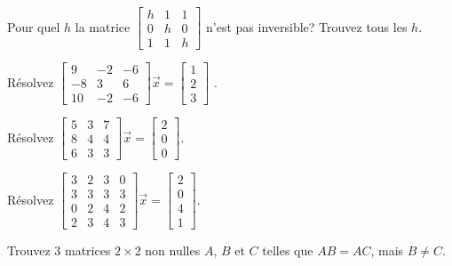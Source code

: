 \begin{exercise}
Pour quel $h$ la matrice
$\left[ \begin{smallmatrix}
h & 1 & 1 \\
0 & h & 0 \\
1 & 1 & h
\end{smallmatrix} \right]$
n'est pas inversible? Trouvez tous les $h$.
\end{exercise}

\begin{exercise}
Résolvez
$\left[ \begin{smallmatrix}
9 & -2 & -6 \\
-8 & 3 & 6 \\
10 & -2 & -6
\end{smallmatrix} \right] \vec{x} =
\left[ \begin{smallmatrix}
1 \\
2 \\
3
\end{smallmatrix} \right]$ .
\end{exercise}

\begin{exercise}
Résolvez
$\left[ \begin{smallmatrix}
5 & 3 & 7 \\
8 & 4 & 4 \\
6 & 3 & 3
\end{smallmatrix} \right] \vec{x} =
\left[ \begin{smallmatrix}
2 \\
0 \\
0
\end{smallmatrix} \right]$.
\end{exercise}

\begin{exercise}
Résolvez
$\left[ \begin{smallmatrix}
3 & 2 & 3 & 0 \\
3 & 3 & 3 & 3 \\
0 & 2 & 4 & 2 \\
2 & 3 & 4 & 3 
\end{smallmatrix} \right] \vec{x} =
\left[ \begin{smallmatrix}
2 \\
0 \\
4 \\
1
\end{smallmatrix} \right]$.
\end{exercise}

\begin{exercise}
Trouvez 3 matrices $2 \times 2$ non nulles $A$, $B$ et $C$ telles que
$AB = AC$, mais $B \not= C$.
\end{exercise}

